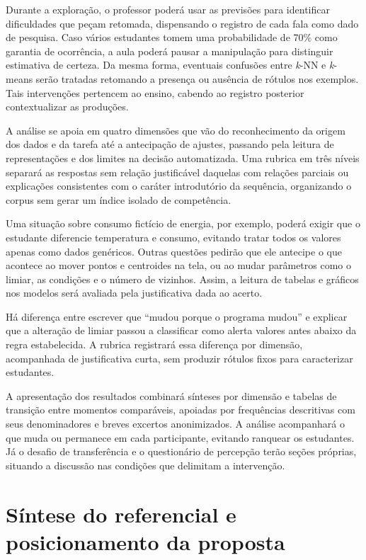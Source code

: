 Durante a exploração, o professor poderá usar as previsões para identificar dificuldades que peçam retomada, dispensando o registro de cada fala como dado de pesquisa. Caso vários estudantes tomem uma probabilidade de 70\% como garantia de ocorrência, a aula poderá pausar a manipulação para distinguir estimativa de certeza. Da mesma forma, eventuais confusões entre \textit{k}-NN e \textit{k}-means serão tratadas retomando a presença ou ausência de rótulos nos exemplos. Tais intervenções pertencem ao ensino, cabendo ao registro posterior contextualizar as produções.

A análise se apoia em quatro dimensões que vão do reconhecimento da origem dos dados e da tarefa até a antecipação de ajustes, passando pela leitura de representações e dos limites na decisão automatizada. Uma rubrica em três níveis separará as respostas sem relação justificável daquelas com relações parciais ou explicações consistentes com o caráter introdutório da sequência, organizando o corpus sem gerar um índice isolado de competência.

Uma situação sobre consumo fictício de energia, por exemplo, poderá exigir que o estudante diferencie temperatura e consumo, evitando tratar todos os valores apenas como dados genéricos. Outras questões pedirão que ele antecipe o que acontece ao mover pontos e centroides na tela, ou ao mudar parâmetros como o limiar, as condições e o número de vizinhos. Assim, a leitura de tabelas e gráficos nos modelos será avaliada pela justificativa dada ao acerto.

Há diferença entre escrever que ``mudou porque o programa mudou'' e explicar que a alteração de limiar passou a classificar como alerta valores antes abaixo da regra estabelecida. A rubrica registrará essa diferença por dimensão, acompanhada de justificativa curta, sem produzir rótulos fixos para caracterizar estudantes.

A apresentação dos resultados combinará sínteses por dimensão e tabelas de transição entre momentos comparáveis, apoiadas por frequências descritivas com seus denominadores e breves excertos anonimizados. A análise acompanhará o que muda ou permanece em cada participante, evitando ranquear os estudantes. Já o desafio de transferência e o questionário de percepção terão seções próprias, situando a discussão nas condições que delimitam a intervenção.

\section{Síntese do referencial e posicionamento da proposta}

